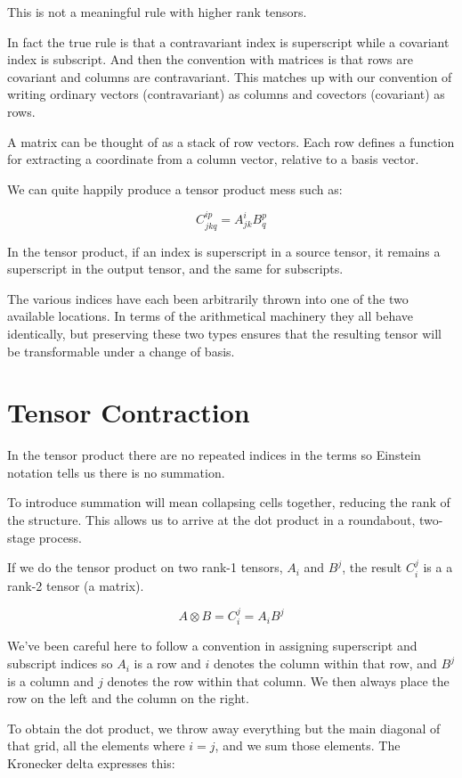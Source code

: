 This is not a meaningful rule with higher rank tensors.

In fact the true rule is that a contravariant index is superscript while a covariant index is subscript. And then the convention with matrices is that rows are covariant and columns are contravariant. This matches up with our convention of writing ordinary vectors (contravariant) as columns and covectors (covariant) as rows.

A matrix can be thought of as a stack of row vectors. Each row defines a function for extracting a coordinate from a column vector, relative to a basis vector.

We can quite happily produce a tensor product mess such as:

$$C^{ip}_{jkq} = A^{i}_{jk}B^{p}_{q}$$

In the tensor product, if an index is superscript in a source tensor, it remains a superscript in the output tensor, and the same for subscripts.

The various indices have each been arbitrarily thrown into one of the two available locations. In terms of the arithmetical machinery they all behave identically, but preserving these two types ensures that the resulting tensor will be transformable under a change of basis.

\section{Tensor Contraction}

In the tensor product there are no repeated indices in the terms so Einstein notation tells us there is no summation.

To introduce summation will mean collapsing cells together, reducing the rank of the structure. This allows us to arrive at the dot product in a roundabout, two-stage process.

If we do the tensor product on two rank-1 tensors, $A_i$ and $B^j$, the result $C^j_i$ is a a rank-2 tensor (a matrix).

$$A \otimes B = C^j_i = A_iB^j$$

We've been careful here to follow a convention in assigning superscript and subscript indices so $A_i$ is a row and $i$ denotes the column within that row, and $B^j$ is a column and $j$ denotes the row within that column. We then always place the row on the left and the column on the right.

To obtain the dot product, we throw away everything but the main diagonal of that grid, all the elements where $i=j$, and we sum those elements. The Kronecker delta expresses this:

